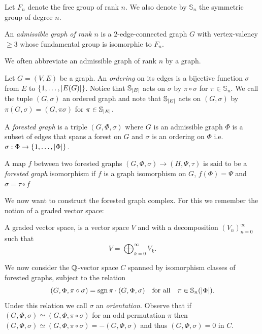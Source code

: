 Let $F_{n}$ denote the free group of rank $n$. We also denote by $\mathbb{S}_{n}$ the symmetric group of degree $n$.
\begin{definition}
	An \emph{admissible graph of rank $n$} is a $2$-edge-connected graph $G$ with vertex-valency $\geq 3$ whose fundamental group is isomorphic to $F_{n}$.
\end{definition}

We often abbreviate an admissible graph of rank $n$ by a graph.

\begin{definition}
	Let $G = (V,E)$ be a graph. An \emph{ordering} on its edges is a bijective function $\sigma$ from $E$ to $\{1,\ldots,\abs{E(G)}\}$.
	Notice that $\mathbb{S}_{\abs{E}}$ acts on $\sigma$ by $\pi \circ \sigma$ for $\pi \in \mathbb{S}_{n}$.
	We call the tuple $(G,\sigma)$ an ordered graph and note that $\mathbb{S}_{\abs{E}}$ acts on $(G,\sigma)$ by $\pi (G,\sigma) = (G,\pi \sigma)$ for $\pi \in \mathbb{S}_{\abs{E}}$.

	A \emph{forested graph} is a triple $(G,\Phi,\sigma)$ where $G$ is an admissible graph $\Phi$ is a subset of edges that spans a forest on $G$ and 
	$\sigma$ is an ordering on $\Phi$ i.e. $\sigma : \Phi \to \{1,\ldots,\abs{\Phi}\}$.

	A map $f$ between two forested graphs $(G,\Phi, \sigma) \to (H,\Psi, \tau)$ is said to be a \emph{forested graph} isomorphism if 
	$f$ is a graph isomorphism on $G$,  $f(\Phi) = \Psi$ and $\sigma = \tau \circ f $
\end{definition}

We now want to construct the forested graph complex. For this we remember the notion of a graded vector space:
\begin{definition}
	A graded vector space, is a vector space $V$ and with a decomposition $\left(V_{n}\right)^{\infty}_{n=0} $ such that
	\[
		V = \bigoplus_{k=0}^{\infty} V_{k}
	.\] 
\end{definition}

We now consider the $\mathbb{Q}$-vector space $C$ spanned by isomorphism classes of forested graphs, subject to the relation
\[
	(G,\Phi, \pi \circ \sigma) = \sgn{\pi} \cdot (G,\Phi, \sigma) \qq{for all} \pi \in \mathbb{S}_{n}(\abs{\Phi})
.\]
Under this relation we call $\sigma$ an \emph{orientation}.
Observe that if $(G,\Phi, \sigma) \simeq (G,\Phi, \pi \circ \sigma)$ for an odd permutation $\pi$ then 
$(G,\Phi, \sigma) \simeq (G,\Phi, \pi \circ \sigma) = - (G,\Phi, \sigma)$ and thus $(G,\Phi, \sigma) = 0$ in  $C$.

